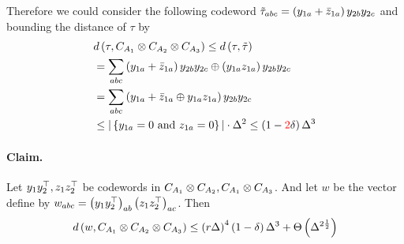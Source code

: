 \documentclass{article}
\begin{document}
\begin{multicols*}{2}
      Therefore we could consider the following codeword $ \tilde{\tau}_{abc} = \left( y_{1a} + \bar{z}_{1a} \right)y_{2b}y_{2c} $ and bounding the distance of $\tau$ by 
      \begin{equation*}
	\begin{split}
      & d \left( \tau, C_{A_{1}} \otimes C_{A_{2}} \otimes C_{A_{3}} \right)  \le d \left( \tau, \tilde{\tau} \right) \\ 
      & = \sum_{abc}{   \left( y_{1a} + \bar{z}_{1a} \right)y_{2b}y_{2c} \oplus  \left( y_{1a}z_{1a} \right)y_{2b}y_{2c}  } \\
      & =  \sum_{abc}{   \left( y_{1a} + \bar{z}_{1a} \oplus y_{1a}z_{1a}  \right)y_{2b}y_{2c}  } \\
      & \le | \left\{ y_{1a} = 0 \text{ and }  z_{1a} = 0   \right\} | \cdot \Delta^{2} \le \left( 1-\color{red}2\color{black}\delta \right)\Delta^{3} 
	\end{split}
      \end{equation*}

      \paragraph{Claim.} Let $y_{1}y_{2}^{\top}, z_{1}z_{2}^{\top}$ be codewords in $C_{A_{1}} \otimes C_{A_{2}}, C_{A_{1}} \otimes C_{A_{3}}$. And let $w$ be the vector define by $w_{abc} = \left( y_{1}y_{2}^{\top} \right)_{ab} \left( z_{1}z_{2}^{\top} \right)_{ac} $. Then  
      \begin{equation*}
	d\left(w, C_{A_{1}} \otimes C_{A_{2}} \otimes C_{A_{3}} \right) \le \left( r\Delta \right)^{4}\left( 1 - \delta \right)\Delta^{3} + \Theta \left( \Delta^{2\frac{1}{2}}  \right)
      \end{equation*}


\end{multicols*}
\end{document}
